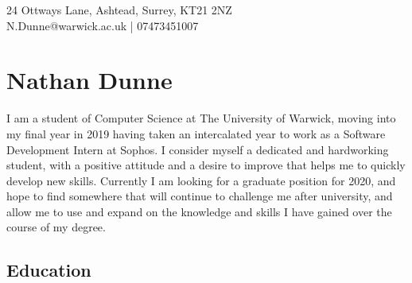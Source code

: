 \documentclass[11pt]{article}
\newcommand{\linesep}{\noindent\makebox[\linewidth]{\rule{\linewidth}{0.2pt}}}
\begin{document}
\hspace*{\fill} 24 Ottways Lane, Ashtead, Surrey, KT21 2NZ \\
\hspace*{\fill} N.Dunne@warwick.ac.uk | 07473451007
\section*{Nathan Dunne}

I am a student of Computer Science at The University of Warwick, moving into my final year in 2019 having taken an intercalated year to work as a Software Development Intern at Sophos. I consider myself a dedicated and hardworking student, with a positive attitude and a desire to improve that helps me to quickly develop new skills. Currently I am looking for a graduate position for 2020, and hope to find somewhere that will continue to challenge me after university, and allow me to use and expand on the knowledge and skills I have gained over the course of my degree.

\linesep
\subsection*{Education}

\newcommand\result[6]{\node[commit] (#1) {}; 
  \node[llabel] at (#1) {#2};
  \node[rlabel] at (#1) {#4};
}

\newcommand\ghost[1]{\coordinate (#1);}
\newcommand\connect[2]{\path (#1) to[out=90,in=-90] (#2);}
\end{document}
